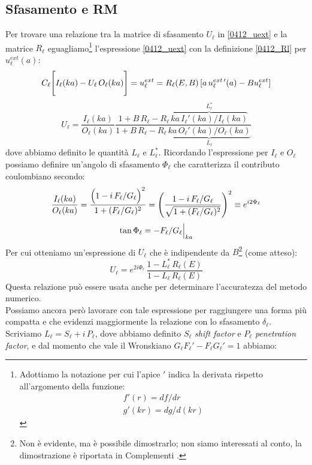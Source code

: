 \subsection{Sfasamento e RM}
Per trovare una relazione tra la matrice di sfasamento $U_\ell$ in \eqref{0412_uext} e la matrice $R_\ell$ eguagliamo\footnote{Adottiamo la notazione per cui l'apice $'$ indica la derivata rispetto all'argomento della funzione:%
\begin{displaymath}%
\begin{array}{l}
	f'(r) = df/dr \\
	g'(kr) = dg/d(kr)
\end{array}
\end{displaymath}%
} l'espressione \eqref{0412_uext} con la definizione \eqref{0412_Rl} per $u^{ext}_\ell (a)$:
$$ C_\ell \Biggl [ I_\ell(ka) - U_\ell \, O_\ell(ka) \Biggr ] = u_\ell^{ext} = R_\ell(E,B) \,[a \, u_\ell^{ext\,\prime}  (a) - B u_\ell^{ext}] $$
$$U_\ell = \frac{I_\ell(ka)}{O_\ell(ka)} \frac{1+B\, R_\ell -R_\ell \, \overbrace{ka \, I_\ell ' (ka)/I_\ell (ka)}^{L_\ell^*}}{1+B\, R_\ell - R_\ell \, \underbrace{ka \,  O_\ell ' (ka)/O_\ell (ka)}_{L_\ell}}$$
dove abbiamo definito le quantità $L_\ell$ e $L_\ell^*$. Ricordando l'espressione per $I_\ell$ e $O_\ell$ possiamo definire un'angolo di sfasamento $\Phi_\ell$ che caratterizza il contributo coulombiano secondo:
$$\frac{I_\ell (ka)}{O_\ell (ka)} = \frac{\Bigl ( 1-i \, F_\ell/G_\ell \Bigr )^2}{1 + (F_\ell/G_\ell)^2} = \Biggl ( \frac{1-i\, F_\ell/G_\ell}{\sqrt{1 + (F_\ell/G_\ell)^2}} \Biggr )^2 \equiv e^{i2\Phi_\ell}$$
$$\tan{\Phi_\ell} = - F_\ell / G_\ell\Bigl |_{ka}$$
Per cui otteniamo un'espressione di $U_\ell$ che è indipendente da $B$\footnote{Non è evidente, ma è possibile dimostrarlo; non siamo interessati al conto, la dimostrazione è riportata in Complementi .} (come atteso): 
$$U_\ell = e^{2i\Phi_\ell} \, \frac{1-L_\ell^* \, R_\ell (E)}{1-L_\ell  \, R_\ell (E)}$$
Questa relazione può essere usata anche per determinare l'accuratezza del metodo numerico. 
\\
Possiamo ancora però lavorare con tale espressione per raggiungere una forma più compatta e che evidenzi maggiormente la relazione con lo sfasamento $\delta_\ell$. Scriviamo $L_\ell = S_\ell + i \, P_\ell$, dove abbiamo definito $S_\ell$ \textit{shift factor} e $P_\ell$ \textit{penetration factor}, e dal momento che vale il Wronskiano $G_\ell F_\ell ' - F_\ell G_\ell ' = 1$ abbiamo:

